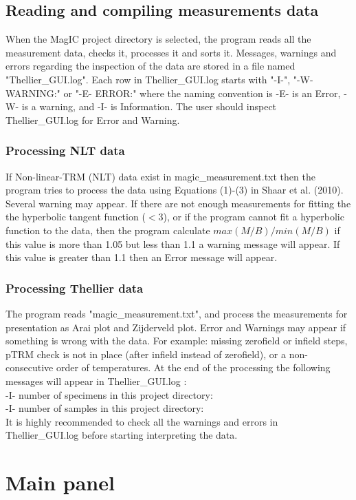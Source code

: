 \documentclass[12pt]{article}
\begin{document}
\subsection{Reading and compiling measurements data}
When the MagIC project directory is selected, the program  reads all the measurement data, checks it, processes it and sorts it. Messages, warnings and errors regarding the inspection of the data are  stored  in a file named "Thellier\_GUI.log". Each row in Thellier\_GUI.log  starts with "-I-", "-W- WARNING:" or "-E- ERROR:" where the naming convention is -E- is an Error, -W- is a warning, and -I- is Information. The user should inspect Thellier\_GUI.log for Error and Warning.  

\subsubsection{Processing NLT data}
If Non-linear-TRM (NLT) data exist in magic\_measurement.txt then the program tries to process the data using Equations (1)-(3) in Shaar et al. (2010). Several warning may appear. If there are not enough measurements for fitting the the hyperbolic tangent function ($<3$), or if the program cannot fit a hyperbolic function to the data, then the program calculate $max(M/B)/ min(M/B)$ if this value is more than 1.05 but less than 1.1 a warning message will appear. If  this value is greater than 1.1  then an Error message will appear.

\subsubsection{Processing Thellier data}
The program reads "magic\_measurement.txt", and process the measurements for presentation as Arai plot and Zijderveld plot. Error and Warnings may appear if something is wrong with the data. For example: missing zerofield or infield steps, pTRM check is not in place (after infield instead of zerofield), or a non-consecutive order of temperatures.  At the end of the processing the following messages will appear in Thellier\_GUI.log :\\
-I- number of specimens in this project directory:\\
-I- number of samples in this project directory:\\
It is highly recommended to check all the warnings and errors in Thellier\_GUI.log before starting interpreting the data.

\section{Main panel}
\end{document}
